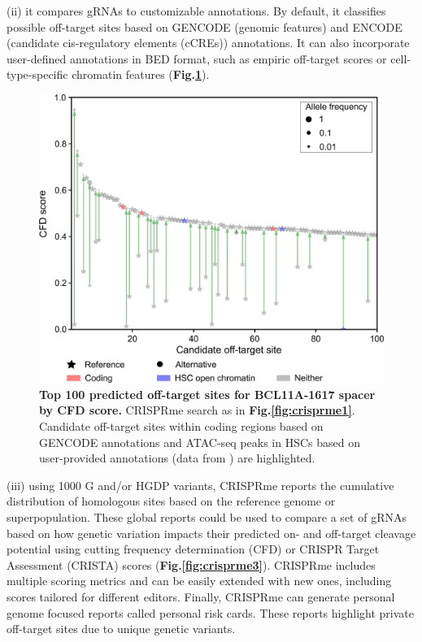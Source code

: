 \documentclass[a4paper, titlepage, openright]{book}
\newcommand{\crisprme}{CRISPRme\xspace}
\begin{document}
(ii) it compares gRNAs to customizable annotations. By default, it classifies possible off-target sites based on GENCODE \citep{frankish2019gencode} (genomic features) and ENCODE \citep{encode2012integrated} (candidate cis-regulatory elements (cCREs)) annotations. It can also incorporate user-defined annotations in BED format, such as empiric off-target scores or cell-type-specific chromatin features (\textbf{Fig.\ref{fig:crisprme2}}).  
\begin{figure}
	\centering
	\includegraphics[width=\textwidth]{figures/crisprme2.png}
	\caption[Top 100 predicted off-target sites for BCL11A-1617 spacer by CFD score]{\textbf{Top 100 predicted off-target sites for BCL11A-1617 spacer by CFD score.} \crisprme search as in \textbf{Fig.\ref{fig:crisprme1}}. Candidate off-target sites within coding regions based on GENCODE annotations and ATAC-seq peaks in HSCs based on user-provided annotations (data from \citep{corces2016lineage}) are highlighted.}
	\label{fig:crisprme2}
\end{figure}
(iii) using 1000 G and/or HGDP variants, \crisprme reports the cumulative distribution of homologous sites based on the reference genome or superpopulation. These global reports could be used to compare a set of gRNAs based on how genetic variation impacts their predicted on- and off-target cleavage potential using cutting frequency determination (CFD) or CRISPR Target Assessment (CRISTA) scores \citep{abadi2017machine} (\textbf{Fig.\ref{fig:crisprme3}}). CRISPRme includes multiple scoring metrics and can be easily extended with new ones, including scores tailored for different editors. Finally, CRISPRme can generate personal genome focused reports called personal risk cards. These reports highlight private off-target sites due to unique genetic variants.
\end{document}
